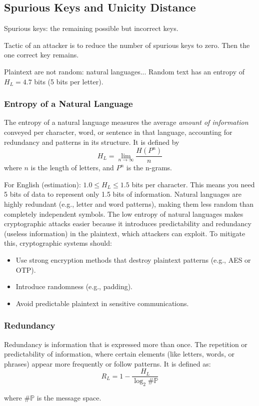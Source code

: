 \subsection{Spurious Keys and Unicity Distance}

\begin{defn}
    Spurious keys: the remaining possible but incorrect keys.
\end{defn}

Tactic of an attacker is to reduce the number of spurious keys to zero. Then the one correct key remains.

Plaintext are not random: natural languages... Random text has an entropy of $H_L = 4.7$ bits (5 bits per letter).

\subsubsection{Entropy of a Natural Language}
\begin{defn}
    The entropy of a natural language measures the average \emph{amount of information} conveyed per character, word, or sentence in that language, accounting for redundancy and patterns in its structure. It is defined by 
    \[H_L = \lim_{n\rightarrow\infty}\frac{H(P^n)}{n}\]
    where $n$ is the length of letters, and $P^n$ is the n-grams.
\end{defn}

For English (estimation): $1.0 \leq H_L \leq 1.5$ bits per character. This means you need 5 bits of data to represent only 1.5 bits of information. Natural languages are highly redundant (e.g., letter and word patterns), making them less random than completely independent symbols.
The low entropy of natural languages makes cryptographic attacks easier because it introduces predictability and redundancy (useless information) in the plaintext, which attackers can exploit. To mitigate this, cryptographic systems should:
\begin{itemize}
    \item Use strong encryption methods that destroy plaintext patterns (e.g., AES or OTP).
    \item Introduce randomness (e.g., padding).
    \item Avoid predictable plaintext in sensitive communications.
\end{itemize}

\subsubsection{Redundancy}
\begin{defn}
    Redundancy is information that is expressed more than once. The repetition or predictability of information, where certain elements (like letters, words, or phrases) appear more frequently or follow patterns. It is defined as:
    \[ R_L = 1-\frac{H_L}{\log_2 \#\mathbb{P}
    }\]

    where $\#\mathbb{P}$ is the message space.
\end{defn}

